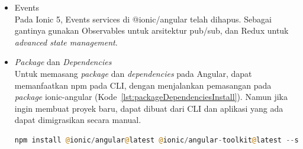 \begin{enumerate}
\begin{itemize}
		\item Events \\
		Pada Ionic 5, Events services di @ionic/angular telah dihapus. Sebagai gantinya gunakan Observables untuk arsitektur pub/sub, dan Redux untuk {\it advanced state management}.
		
		\item {\it Package} dan {\it Dependencies} \\
		Untuk memasang {\it package} dan {\it dependencies} pada Angular, dapat memanfaatkan npm pada CLI, dengan menjalankan pemasangan pada {\it package} ionic-angular  (Kode~\ref{lst:packageDependenciesInstall}). Namun jika ingin membuat proyek baru, dapat dibuat dari CLI dan aplikasi yang ada dapat dimigrasikan secara manual.
		\begin{lstlisting}[language=php, label={lst:packageDependenciesInstall}, caption=Kode untuk Memasang {\it Package} dan {\it Dependencies} pada Angular]
npm install @ionic/angular@latest @ionic/angular-toolkit@latest --save
		\end{lstlisting} 
	\end{itemize}


\end{enumerate}




%




